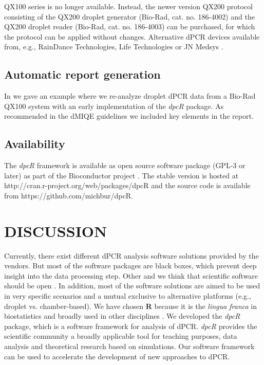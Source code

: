 \documentclass[a4,center,fleqn]{NAR}
\begin{document}
QX100 series is no longer available. Instead, the newer version QX200 protocol 
consisting of the QX200 droplet generator (Bio-Rad, cat. no. 186-4002) and the 
QX200 droplet reader (Bio-Rad, cat. no. 186-4003) can be purchased, for which 
the protocol can be applied without changes. Alternative dPCR devices available 
from, e.g., RainDance Technologies, Life Technologies or JN Medsys 
\citep{mock_digital_2016}.

\subsection{Automatic report generation}

In \cite{rodiger_r_2015} we gave an example where we re-analyze droplet dPCR 
data from a Bio-Rad QX100 system with an early implementation of the 
\textit{dpcR} package. As recommended in the dMIQE guidelines 
\cite{huggett_digital_2013} we included key elements in the report.

\subsection{Availability}

The \textit{dpcR} framework is available as open source software package (GPL-3 
or later) as part of the Bioconductor project \cite{gentleman_2004}. The stable 
version is hosted at http://cran.r-project.org/web/packages/dpcR and the source 
code is available from  https://github.com/michbur/dpcR.

\section{DISCUSSION}

Currently, there exist different dPCR analysis software solutions provided by 
the vendors. But most of the software packages are black boxes, which prevent 
deep insight into the data processing step. Other and we think that scientific 
software should be open \cite{ince_case_2012, rodiger_r_2015}. In addition, most 
of the software solutions are aimed to be used in very specific scenarios and a 
mutual exclusive to alternative platforms (e.g., droplet vs. chamber-based). We 
have chosen \textbf{R} because it is the \textit{lingua franca} in biostatistics 
and broadly used in other disciplines \cite{rodiger_r_2015}. We developed the 
\textit{dpcR} package, which is a software framework for analysis of dPCR. 
\textit{dpcR} provides the scientific community a broadly applicable tool for 
teaching purposes, data analysis and theoretical research based on simulations. 
Our software framework can be used to accelerate the development of new 
approaches to dPCR.
\end{document}
